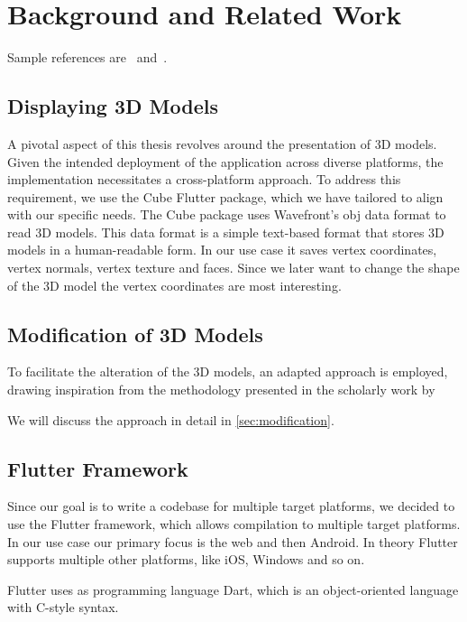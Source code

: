\setcounter{chapter}{1}

\chapter{Background and Related Work}

Sample references are~\cite{Zwicker04Perspective} and~\cite{Altman89QuaternionScandal}.

\section{Displaying 3D Models}

A pivotal aspect of this thesis revolves around the presentation of 3D models. Given the intended deployment of the application across diverse platforms, the implementation necessitates a cross-platform approach. 
To address this requirement, we use the Cube Flutter package, which we have tailored to align with our specific needs. The Cube package uses Wavefront's obj data format to read 3D models.
This data format is a simple text-based format that stores 3D models in a human-readable form. In our use case it saves vertex coordinates, vertex normals, vertex texture and faces. Since we later want to change
the shape of the 3D model the vertex coordinates are most interesting.


\section{Modification of 3D Models}

To facilitate the alteration of the 3D models, an adapted approach is employed, drawing inspiration from the methodology presented in the scholarly work by %

We will discuss the approach in detail in \ref{sec:modification}.

\section{Flutter Framework}

Since our goal is to write a codebase for multiple target platforms, we decided to use the Flutter framework, which allows compilation to multiple target platforms. In our use case our primary focus is the web
and then Android. In theory Flutter supports multiple other platforms, like iOS, Windows and so on. 

Flutter uses as programming language Dart, which is an object-oriented language with C-style syntax. 


